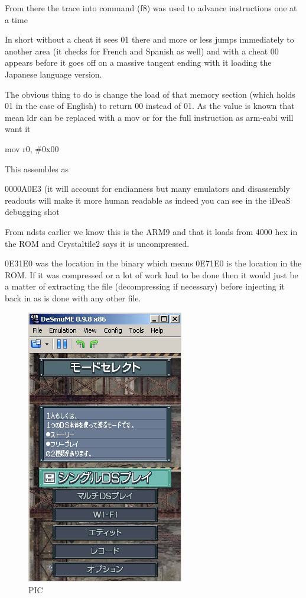 \documentclass[
]{book}
\begin{document}
From there the trace into command (f8) was used to advance instructions one at a time

In short without a cheat it sees 01 there and more or less jumps immediately to another area (it checks for French and Spanish as well) and with a cheat 00 appears before it goes off on a massive tangent ending with it loading the Japanese language version.

The obvious thing to do is change the load of that memory section (which holds 01 in the case of English) to return 00 instead of 01. As the value is known that mean ldr can be replaced with a mov or for the full instruction as arm-eabi will want it

mov r0, \#0x00

This assembles as

0000A0E3 (it will account for endianness but many emulators and disassembly readouts will make it more human readable as indeed you can see in the iDeaS debugging shot

From ndsts earlier we know this is the ARM9 and that it loads from 4000 hex in the ROM and Crystaltile2 says it is uncompressed.

0E31E0 was the location in the binary which means 0E71E0 is the location in the ROM. If it was compressed or a lot of work had to be done then it would just be a matter of extracting the file (decompressing if necessary) before injecting it back in as is done with any other file.

\begin{figure}
\centering
\includegraphics{images/219_home_fast6191_romhackingguide_unrenamed_fil___iginal_borders_romhackguideasmlanguagemod_4.png}
\caption{PIC}
\end{figure}
\end{document}
